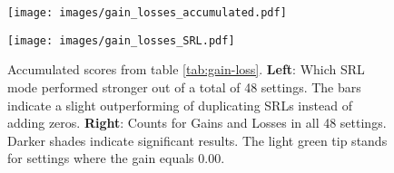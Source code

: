 \begin{figure}
  \begin{minipage}{0.45\linewidth}
  \vspace{0pt}
    \texttt{[image: images/gain\_losses\_accumulated.pdf]}
  \end{minipage}
  \hfill
  \begin{minipage}{0.45\linewidth}
  \vspace{0pt}
    \texttt{[image: images/gain\_losses\_SRL.pdf]}
  \end{minipage}
  \caption[Accumulated Gains and Losses.]{Accumulated scores from table \ref{tab:gain-loss}. \textbf{Left}: Which SRL mode performed stronger out of a total of 48 settings. The bars indicate a slight outperforming of duplicating SRLs instead of adding zeros. \textbf{Right}: Counts for Gains and Losses in all 48 settings. Darker shades indicate significant results. The light green tip stands for settings where the gain equals 0.00.}
\end{figure}




